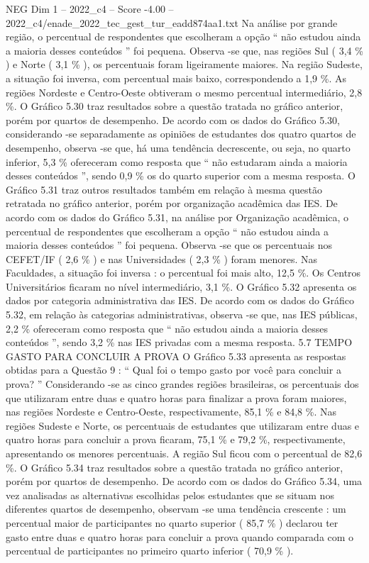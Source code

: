 \begin{textsample}{NEG Dim 1 – 2022\_c4 – Score -4.00 – 2022\_c4/enade\_2022\_tec\_gest\_tur\_eadd874aa1.txt}
Na análise por grande região, o percentual de respondentes que escolheram a opção “ não estudou ainda a maioria desses conteúdos ” foi pequena.
Observa -se que, nas regiões Sul ( 3,4 \% ) e Norte ( 3,1 \% ), os percentuais foram ligeiramente maiores.
Na região Sudeste, a situação foi inversa, com percentual mais baixo, correspondendo a 1,9 \%.
As regiões Nordeste e Centro-Oeste obtiveram o mesmo percentual intermediário, 2,8 \%.
O Gráfico 5.30 traz resultados sobre a questão tratada no gráfico anterior, porém por quartos de desempenho.
De acordo com os dados do Gráfico 5.30, considerando -se separadamente as opiniões de estudantes dos quatro quartos de desempenho, observa -se que, há uma tendência decrescente, ou seja, no quarto inferior, 5,3 \% ofereceram como resposta que “ não estudaram ainda a maioria desses conteúdos ”, sendo 0,9 \% os do quarto superior com a mesma resposta.
O Gráfico 5.31 traz outros resultados também em relação à mesma questão retratada no gráfico anterior, porém por organização acadêmica das IES.
De acordo com os dados do Gráfico 5.31, na análise por Organização acadêmica, o percentual de respondentes que escolheram a opção “ não estudou ainda a maioria desses conteúdos ” foi pequena.
Observa -se que os percentuais nos CEFET/IF ( 2,6 \% ) e nas Universidades ( 2,3 \% ) foram menores.
Nas Faculdades, a situação foi inversa : o percentual foi mais alto, 12,5 \%.
Os Centros Universitários ficaram no nível intermediário, 3,1 \%.
O Gráfico 5.32 apresenta os dados por categoria administrativa das IES.
De acordo com os dados do Gráfico 5.32, em relação às categorias administrativas, observa -se que, nas IES públicas, 2,2 \% ofereceram como resposta que “ não estudou ainda a maioria desses conteúdos ”, sendo 3,2 \% nas IES privadas com a mesma resposta. 5.7 TEMPO GASTO PARA CONCLUIR A PROVA O Gráfico 5.33 apresenta as respostas obtidas para a Questão 9 : “ Qual foi o tempo gasto por você para concluir a prova? ” Considerando -se as cinco grandes regiões brasileiras, os percentuais dos que utilizaram entre duas e quatro horas para finalizar a prova foram maiores, nas regiões Nordeste e Centro-Oeste, respectivamente, 85,1 \% e 84,8 \%.
Nas regiões Sudeste e Norte, os percentuais de estudantes que utilizaram entre duas e quatro horas para concluir a prova ficaram, 75,1 \% e 79,2 \%, respectivamente, apresentando os menores percentuais.
A região Sul ficou com o percentual de 82,6 \%.
O Gráfico 5.34 traz resultados sobre a questão tratada no gráfico anterior, porém por quartos de desempenho.
De acordo com os dados do Gráfico 5.34, uma vez analisadas as alternativas escolhidas pelos estudantes que se situam nos diferentes quartos de desempenho, observam -se uma tendência crescente : um percentual maior de participantes no quarto superior ( 85,7 \% ) declarou ter gasto entre duas e quatro horas para concluir a prova quando comparada com o percentual de participantes no primeiro quarto inferior ( 70,9 \% ).

\end{textsample}
